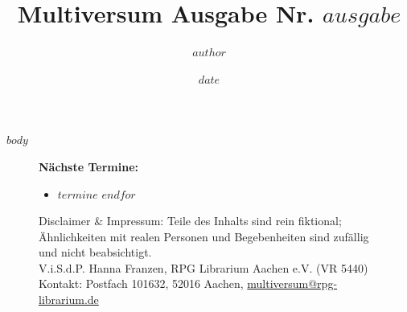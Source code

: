 \documentclass[a4paper,10pt,oneside,twocolumn,final,article]{memoir}
\author{$author$}
\date{$date$}
\title{Multiversum Ausgabe Nr. $ausgabe$}
\begin{document}
%

$body$

\begin{figure}[!b]
	\begin{framed}
		\textbf{Nächste Termine:} \par

		\begin{itemize}
			$for(termine)$ \item $termine$ $endfor$
		\end{itemize}
	\end{framed}
	\vspace*{-2mm}
	\begin{Spacing}{0.5}
	\tiny Disclaimer \& Impressum: Teile des Inhalts sind rein fiktional; Ähnlichkeiten mit realen Personen und Begebenheiten sind zufällig und nicht beabsichtigt.\\
	V.i.S.d.P. Hanna Franzen, RPG Librarium Aachen e.V. (VR 5440) \\
	Kontakt: Postfach 101632, 52016 Aachen, \href{mailto:multiversum@rpg-librarium.de}{multiversum@rpg-librarium.de} \\
	\\
	\doclicenseText
	\doclicenseImage[imagewidth=7em]
	\end{Spacing}
\end{figure}
%
\end{document}
